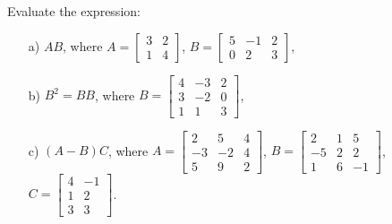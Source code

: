 \begin{problem}
    Evaluate the expression:

    \begin{enumerate}
        \item[a) ] $AB$, where $A=\begin{bmatrix}
        3&2\\1&4   \end{bmatrix}$, $B=\begin{bmatrix}
        5&-1&2\\0&2&3   \end{bmatrix}$,

        \item[b) ] $B^2=BB$, where $B=\begin{bmatrix}
        4&-3&2\\3&-2&0\\1&1&3   \end{bmatrix}$,
        
        \item[c) ] $(A-B)C$, where $A=\begin{bmatrix}
        2&5&4\\-3&-2&4\\5&9&2   \end{bmatrix}$, $B=\begin{bmatrix}
        2&1&5\\-5&2&2\\1&6&-1   \end{bmatrix}$, $C=\begin{bmatrix}
        4&-1\\1&2\\3&3   \end{bmatrix}$.
    \end{enumerate}
\end{problem}
\bigskip




